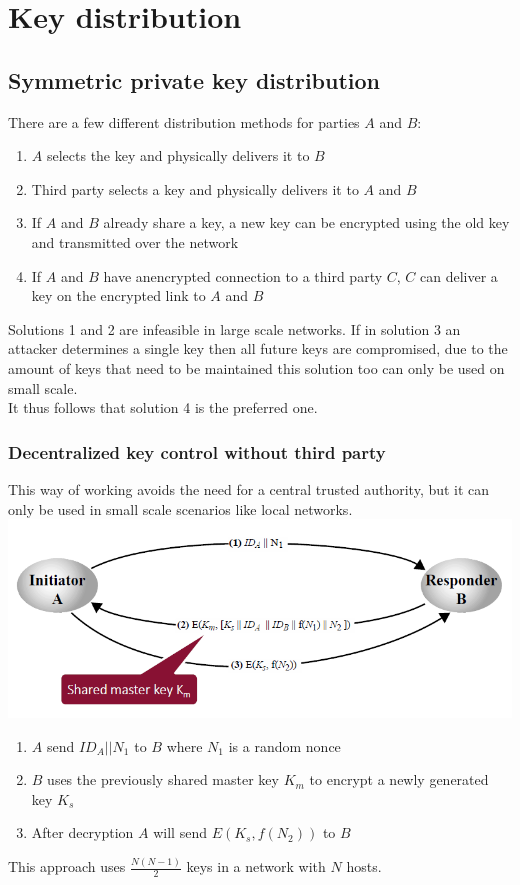 \documentclass[12pt]{article}
\begin{document}
 \section{Key distribution}
 \subsection{Symmetric private key distribution}
 \noindent{}

 There are a few different distribution methods for parties $A$ and $B$:
 \begin{enumerate}
 	\item $A$ selects the key and physically delivers it to $B$
 	\item Third party selects a key and physically delivers it to $A$ and $B$
 	\item If $A$ and $B$ already share a key, a new key can be encrypted using the old key and transmitted over the network
 	\item If $A$ and $B$ have anencrypted connection to a third party $C$, $C$ can deliver a key on the encrypted link to $A$ and $B$
 \end{enumerate}
 Solutions 1 and 2 are infeasible in large scale networks. If in solution 3 an attacker determines a single key then all future keys are compromised, due to the amount of keys that need to be maintained this solution too can only be used on small scale.\\
 It thus follows that solution 4 is the preferred one.

 \subsubsection{Decentralized key control without third party}
 This way of working avoids the need for a central trusted authority, but it can only be used in small scale scenarios like local networks.\\
 \includegraphics[width=\linewidth]{./slides/L5P1.PNG}
 \begin{enumerate}
 	\item $A$ send $ID_A||N_1$ to $B$ where $N_1$ is a random nonce
 	\item $B$ uses the previously shared master key $K_m$ to encrypt a newly generated key $K_s$
 	\item After decryption $A$ will send $E(K_s, f(N_2))$ to $B$
 \end{enumerate}
This approach uses $\frac{N(N-1)}{2}$ keys in a network with $N$ hosts.
 
\end{document}
